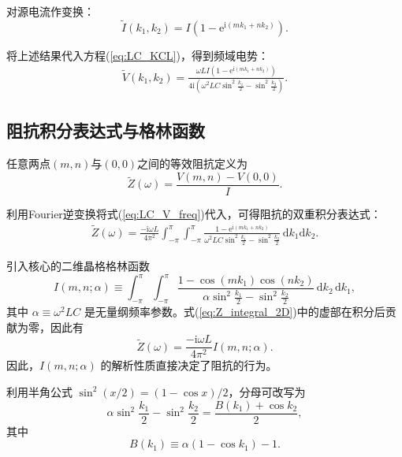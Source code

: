 \documentclass{article} %
\newcommand{\di}{\mathrm{d}}
\newcommand{\ii}{\mathrm{i}}
\newcommand{\e}[1]{\mathrm{e}^{#1}}
\begin{document}
对源电流作变换：
\begin{equation}
  \tilde I(k_1,k_2)=I\left(1-\e{\ii(mk_1+nk_2)}\right).
\end{equation}

将上述结果代入方程(\ref{eq:LC_KCL})，得到频域电势：
\begin{align}
  \tilde V(k_1,k_2)=
  \frac{\omega L I\left(1-\e{\ii(mk_1+nk_2)}\right)}
  {4\ii\left(\omega^2 LC\sin^2\frac{k_1}{2}-\sin^2\frac{k_2}{2}\right)}.
\label{eq:LC_V_freq}
\end{align}

\subsection{阻抗积分表达式与格林函数}

任意两点$(m,n)$与$(0,0)$之间的等效阻抗定义为
\begin{equation}
  \tilde Z(\omega)=\frac{V(m,n)-V(0,0)}{I}.
\end{equation}

利用Fourier逆变换将式(\ref{eq:LC_V_freq})代入，可得阻抗的双重积分表达式：
\begin{align}
  \tilde Z(\omega)=
  \frac{-\ii\omega L}{4\pi^2}
  \int_{-\pi}^{\pi}\int_{-\pi}^{\pi}
  \frac{1-\e{\ii(mk_1+nk_2)}}
  {\omega^2 LC\sin^2\frac{k_1}{2}-\sin^2\frac{k_2}{2}}
  \,\di k_1\di k_2.
\label{eq:Z_integral_2D}
\end{align}

引入核心的二维晶格格林函数
\begin{equation}
    I(m,n;\alpha) \equiv
    \int_{-\pi}^{\pi}\int_{-\pi}^{\pi}
    \frac{1-\cos(mk_1)\cos(nk_2)}
    {\alpha\sin^2\frac{k_1}{2}-\sin^2\frac{k_2}{2}}
    \,\di k_2\,\di k_1,
    \label{eq:I_mn_definition}
\end{equation}
其中 $\alpha \equiv \omega^2 LC$ 是无量纲频率参数。式(\ref{eq:Z_integral_2D})中的虚部在积分后贡献为零，因此有
\begin{equation}
    \tilde Z(\omega) = \frac{-\ii\omega L}{4\pi^2} I(m,n;\alpha).
    \label{eq:Z_I_relation}
\end{equation}
因此，$I(m,n;\alpha)$ 的解析性质直接决定了阻抗的行为。

利用半角公式 $\sin^2(x/2) = (1-\cos x)/2$，分母可改写为
\begin{equation}
    \alpha \sin^2\frac{k_1}{2} - \sin^2\frac{k_2}{2}
    = \frac{B(k_1) + \cos k_2}{2},
    \label{eq:denominator_transform}
\end{equation}
其中
\begin{equation}
    B(k_1) \equiv \alpha(1-\cos k_1) - 1.
    \label{eq:B_definition}
\end{equation}
\end{document}

